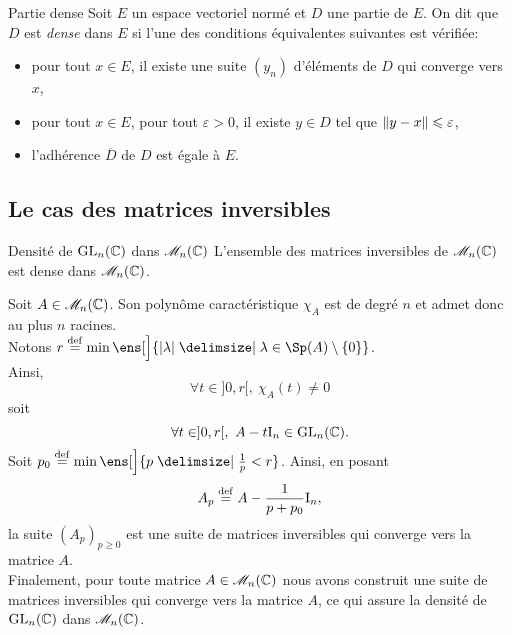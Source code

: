 \begin{defi}{Partie dense}
    Soit $E$ un espace vectoriel normé et $D$ une partie de $E$. On dit que $D$ est \emph{dense} dans $E$ si l'une des conditions équivalentes suivantes est vérifiée:
    \begin{itemize}
        \item pour tout $x \in E$, il existe une suite $(y_n)$ d'éléments de $D$ qui converge vers $x$,
        \item pour tout $x \in E$, pour tout $\varepsilon > 0$, il existe $y \in D$ tel que $\Vert y - x \Vert \leqslant \varepsilon$,
        \item l'adhérence $\overline{D}$ de $D$ est égale à $E$.
    \end{itemize}
\end{defi}

\subsection{Le cas des matrices inversibles}

\begin{theo}{Densité de $\mathrm{GL}_n(\mathbb{C})$ dans $\mathscr{M}_n(\mathbb{C})$}
    L'ensemble des matrices inversibles de $\mathscr{M}_n(\mathbb{C})$ est dense dans $\mathscr{M}_n(\mathbb{C})$.
\end{theo}

\begin{preuve}
    Soit $A \in \mathscr{M}_n(\mathbb{C})$. Son polynôme caractéristique $\chi_A$ est de degré $n$ et admet donc au plus $n$ racines. \\
    Notons $r \defeq \min \ens[\Big]{ |\lambda| \tq \lambda \in \Sp(A) \setminus \{0\}}$. \\
    Ainsi,
    $$\forall t \in ]0,r[,\ \chi_A(t) \not= 0$$ 
    soit 
    $$\forall t \in ]0,r[,\ A - t \mathrm{I}_n\in \mathrm{GL}_n(\mathbb{C}).$$
    Soit $p_0 \defeq \min \ens[\Big]{ p \tq \frac{1}{p} < r}$. Ainsi, en posant
    $$A_p \overset{\mathrm{\tiny def}}{=} A - \frac{1}{p + p_0} \mathrm{I}_n,$$
    la suite $(A_p)_{p \geqslant 0}$ est une suite de matrices inversibles qui converge vers la matrice $A$. \\
    Finalement, pour toute matrice $A \in \mathscr{M}_n(\mathbb{C})$ nous avons construit une suite de matrices inversibles qui converge vers la matrice $A$, ce qui assure la densité de $\mathrm{GL}_n(\mathbb{C})$ dans $\mathscr{M}_n(\mathbb{C})$.
\end{preuve}

\begin{marginfigure}[-8cm]
    \centering
    
\end{marginfigure}

